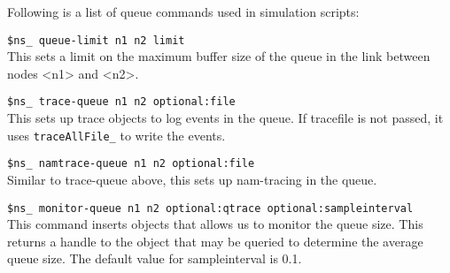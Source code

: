 Following is a list of queue commands used in simulation scripts:
\begin{flushleft}
{\tt \$ns\_ queue-limit \<n1\> \<n2\> \<limit\>}\\
This sets a limit on the maximum buffer size of the queue in the link between
nodes <n1> and <n2>.


{\tt \$ns\_ trace-queue \<n1\> \<n2\> \<optional:file\>}\\
This sets up trace objects to log events in the queue. If tracefile is not
passed, it uses {\tt traceAllFile\_} to write the events.


{\tt \$ns\_ namtrace-queue \<n1\> \<n2\> \<optional:file\>}\\
Similar to trace-queue above, this sets up nam-tracing in the queue.


{\tt \$ns\_ monitor-queue \<n1\> \<n2\> \<optional:qtrace\> \<optional:sampleinterval\>}\\
This command inserts objects that allows us to monitor the queue size. This
returns a handle to the object that may be queried to determine the average
queue size. The default value for sampleinterval is 0.1.


\end{flushleft}



\endinput
